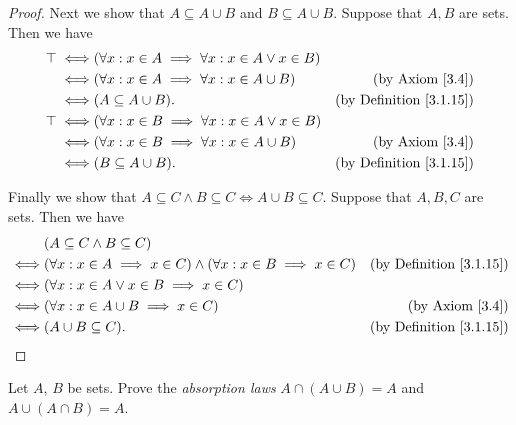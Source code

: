 \begin{proof}
    Next we show that \(A \subseteq A \cup B\) and \(B \subseteq A \cup B\).
    Suppose that \(A, B\) are sets.
    Then we have
    \begin{align*}
        \top \iff & (\forall x : x \in A \implies \forall x : x \in A \lor x \in B)                                       \\
        \iff      & (\forall x : x \in A \implies \forall x : x \in A \cup B)       & \text{(by Axiom \ref{3.4})}         \\
        \iff      & (A \subseteq A \cup B).                                         & \text{(by Definition \ref{3.1.15})} \\
        \top \iff & (\forall x : x \in B \implies \forall x : x \in A \lor x \in B)                                       \\
        \iff      & (\forall x : x \in B \implies \forall x : x \in A \cup B)       & \text{(by Axiom \ref{3.4})}         \\
        \iff      & (B \subseteq A \cup B).                                         & \text{(by Definition \ref{3.1.15})}
    \end{align*}

    Finally we show that \(A \subseteq C \land B \subseteq C \iff A \cup B \subseteq C\).
    Suppose that \(A, B, C\) are sets.
    Then we have
    \begin{align*}
             & (A \subseteq C \land B \subseteq C)                                                                                       \\
        \iff & (\forall x : x \in A \implies x \in C) \land (\forall x : x \in B \implies x \in C) & \text{(by Definition \ref{3.1.15})} \\
        \iff & (\forall x : x \in A \lor x \in B \implies x \in C)                                                                       \\
        \iff & (\forall x : x \in A \cup B \implies x \in C)                                       & \text{(by Axiom \ref{3.4})}         \\
        \iff & (A \cup B \subseteq C).                                                             & \text{(by Definition \ref{3.1.15})}
    \end{align*}
\end{proof}

\begin{exercise}\label{ex 3.1.8}
    Let \(A\), \(B\) be sets.
    Prove the \emph{absorption laws} \(A \cap (A \cup B) = A\) and \(A \cup (A \cap B) = A\).
\end{exercise}

